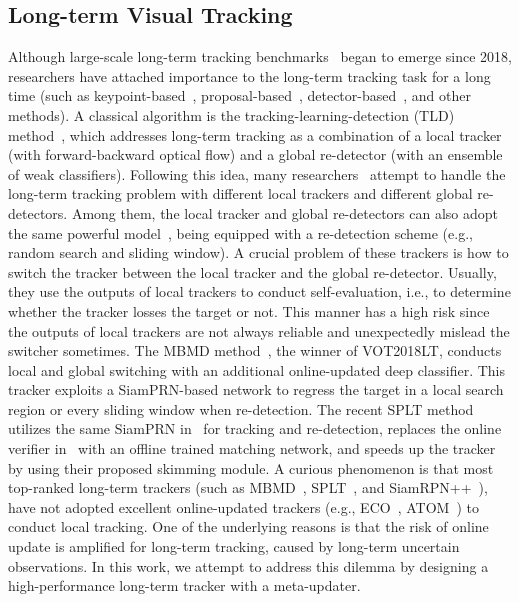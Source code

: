 \documentclass[10pt,twocolumn,letterpaper]{article}
\begin{document}
\subsection{Long-term Visual Tracking}
\vspace{-2mm}
Although large-scale long-term tracking benchmarks~\cite{VOT2018report,OxUvA} began to emerge since
2018, researchers have attached importance to the long-term tracking task for a long time
(such as keypoint-based~\cite{MUSTer}, proposal-based~\cite{EBT}, detector-based~\cite{TLD,FCLT},
and other methods).
A classical algorithm is the tracking-learning-detection (TLD) method~\cite{TLD}, which addresses long-term tracking
as a combination of a local tracker (with forward-backward optical flow) and a global re-detector
(with an ensemble of weak classifiers).
Following this idea, many researchers~\cite{LCT,FCLT,OxUvA} attempt to handle the long-term tracking problem
with different local trackers and different global re-detectors.
Among them, the local tracker and global re-detectors can also adopt the same powerful
model~\cite{FCLT,SiamRPNplus,Zhang-VOT18-MBMD,Yan-ICCV19-SPLT}, being equipped with
a re-detection scheme (e.g., random search and sliding window).
A crucial problem of these trackers is how to switch the tracker between the local tracker and the global re-detector.
Usually, they use the outputs of local trackers to conduct self-evaluation, i.e., to determine whether the tracker losses
the target or not.
This manner has a high risk since the outputs of local trackers are not always reliable and unexpectedly mislead
the switcher sometimes.
The MBMD method~\cite{Zhang-VOT18-MBMD}, the winner of VOT2018LT, conducts local and global switching
with an additional online-updated deep classifier.
This tracker exploits a SiamPRN-based network to regress the target in a local search region or every sliding window
when re-detection.
The recent SPLT method~\cite{Yan-ICCV19-SPLT} utilizes the same
SiamPRN in~\cite{Zhang-VOT18-MBMD} for tracking and re-detection, replaces the online
verifier in~\cite{Zhang-VOT18-MBMD} with an offline trained matching network,
and speeds up the tracker by using their proposed skimming module.
A curious phenomenon is that most top-ranked long-term trackers (such as MBMD~\cite{Zhang-VOT18-MBMD},
SPLT~\cite{Yan-ICCV19-SPLT}, and SiamRPN++~\cite{SiamRPNplus}), have not adopted excellent
online-updated trackers (e.g., ECO~\cite{Danelljan-CVPR17-ECO}, ATOM~\cite{Danelljan-CVPR19-ATOM})
to conduct local tracking.
One of the underlying reasons is that the risk of online update is amplified for long-term tracking, caused by
long-term uncertain observations.
In this work, we attempt to address this dilemma by designing a high-performance long-term tracker with a meta-updater.
\end{document}
